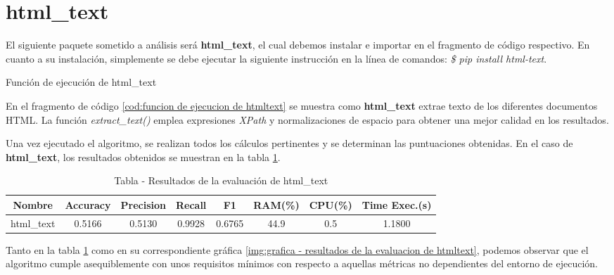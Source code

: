 \section*{html\_text}

El siguiente paquete sometido a análisis será \textbf{html\_text}, el cual debemos instalar e importar en 
el fragmento de código respectivo. En cuanto a su instalación, simplemente se debe ejecutar la siguiente 
instrucción en la línea de comandos: \emph{\$ pip install html-text}.

\begin{codefloat}
    
    \caption{Función de ejecución de html\_text}
    \label{cod:funcion de ejecucion de htmltext}
\end{codefloat}

En el fragmento de código \ref{cod:funcion de ejecucion de htmltext} se muestra como \textbf{html\_text} 
extrae texto de los diferentes documentos HTML. La función \emph{extract\_text()} emplea expresiones 
\emph{XPath} y normalizaciones de espacio para obtener una mejor calidad en los resultados.

Una vez ejecutado el algoritmo, se realizan todos los cálculos pertinentes y se determinan las puntuaciones 
obtenidas. En el caso de \textbf{html\_text}, los resultados obtenidos se muestran en la tabla 
\ref{tab:tabla - resultados de la evaluacion de htmltext}.

\begin{table}[h]
    \begin{center}
      \begin{tabular}{| c | c | c | c | c | c | c | c |} \hline 
       \textbf{Nombre} & \textbf{Accuracy} & \textbf{Precision}  & \textbf{Recall} & \textbf{F1} & \textbf{RAM(\%)} & \textbf{CPU(\%)} & \textbf{Time Exec.(s)} \\ \hline
       html\_text & 0.5166 & 0.5130 & 0.9928 & 0.6765 & 44.9 & 0.5 & 1.1800 \\ \hline
      \end{tabular}
      \caption{Tabla - Resultados de la evaluación de html\_text}
      \label{tab:tabla - resultados de la evaluacion de htmltext}
    \end{center}
\end{table}

Tanto en la tabla \ref{tab:tabla - resultados de la evaluacion de htmltext} como en su correspondiente
gráfica \ref{img:grafica - resultados de la evaluacion de htmltext}, podemos observar que el algoritmo
cumple asequiblemente con unos requisitos mínimos con respecto a aquellas métricas no dependientes del
entorno de ejecución.

